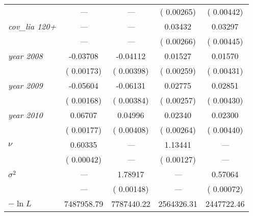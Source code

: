 {\begin{ThreePartTable}
\begin{longtable}{lcccc}
    & \scriptsize{\textit{---}} & \scriptsize{\textit{---}} & \scriptsize{( 0.00265)} & \scriptsize{( 0.00442)} \\
    \textit{cov\_lia 120+} & \textit{---} & \textit{---} &  0.03432 &  0.03297 \\
    & \scriptsize{\textit{---}} & \scriptsize{\textit{---}} & \scriptsize{( 0.00266)} & \scriptsize{( 0.00445)} \\
    \textit{year 2008} & -0.03708 & -0.04112 &  0.01527 &  0.01570 \\
    & \scriptsize{( 0.00173)} & \scriptsize{( 0.00398)} & \scriptsize{( 0.00259)} & \scriptsize{( 0.00431)} \\
    \textit{year 2009} & -0.05604 & -0.06131 &  0.02775 &  0.02851 \\
    & \scriptsize{( 0.00168)} & \scriptsize{( 0.00384)} & \scriptsize{( 0.00257)} & \scriptsize{( 0.00430)} \\
    \textit{year 2010} &  0.06707 &  0.04996 &  0.02340 &  0.02300 \\
    & \scriptsize{( 0.00177)} & \scriptsize{( 0.00408)} & \scriptsize{( 0.00264)} & \scriptsize{( 0.00440)} \\
    $\nu$ &  0.60335 & \textit{---} &  1.13441 & \textit{---} \\
    & \scriptsize{( 0.00042)} & \scriptsize{\textit{---}} & \scriptsize{( 0.00127)} & \scriptsize{\textit{---}} \\
    $\sigma^{2}$ & \textit{---} &  1.78917 & \textit{---} &  0.57064 \\
    & \scriptsize{\textit{---}} & \scriptsize{( 0.00148)} & \scriptsize{\textit{---}} & \scriptsize{( 0.00072)} \\
    $-\ln L$ & 7487958.79 & 7787440.22 & 2564326.31 & 2447722.46 \\
\end{longtable}
\end{ThreePartTable}
}
